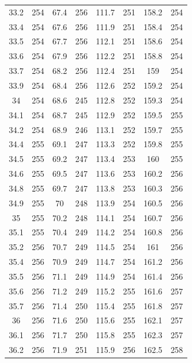 \documentclass[12pt]{ctexart}
\numberwithin{equation}{section}
\begin{document}
\begin{longtable}{cc|cc|cc|cc}
33.2  &  254  &  67.4  &  256  &  111.7  &  251  &  158.2  &  254  \\
33.4  &  254  &  67.6  &  256  &  111.9  &  251  &  158.4  &  254  \\
33.5  &  254  &  67.7  &  256  &  112.1  &  251  &  158.6  &  254  \\
33.6  &  254  &  67.9  &  256  &  112.2  &  251  &  158.8  &  254  \\
33.7  &  254  &  68.2  &  256  &  112.4  &  251  &  159  &  254  \\
33.9  &  254  &  68.4  &  256  &  112.6  &  252  &  159.2  &  254  \\
34  &  254  &  68.6  &  245  &  112.8  &  252  &  159.3  &  254  \\
34.1  &  254  &  68.7  &  245  &  112.9  &  252  &  159.5  &  255  \\
34.2  &  254  &  68.9  &  246  &  113.1  &  252  &  159.7  &  255  \\
34.4  &  255  &  69.1  &  247  &  113.3  &  252  &  159.8  &  255  \\
34.5  &  255  &  69.2  &  247  &  113.4  &  253  &  160  &  255  \\
34.6  &  255  &  69.5  &  247  &  113.6  &  253  &  160.2  &  256  \\
34.8  &  255  &  69.7  &  247  &  113.8  &  253  &  160.3  &  256  \\
34.9  &  255  &  70  &  248  &  113.9  &  254  &  160.5  &  256  \\
35  &  255  &  70.2  &  248  &  114.1  &  254  &  160.7  &  256  \\
35.1  &  255  &  70.4  &  249  &  114.2  &  254  &  160.8  &  256  \\
35.2  &  256  &  70.7  &  249  &  114.5  &  254  &  161  &  256  \\
35.4  &  256  &  70.9  &  249  &  114.7  &  254  &  161.2  &  256  \\
35.5  &  256  &  71.1  &  249  &  114.9  &  254  &  161.4  &  256  \\
35.6  &  256  &  71.2  &  249  &  115.2  &  255  &  161.6  &  257  \\
35.7  &  256  &  71.4  &  250  &  115.4  &  255  &  161.8  &  257  \\
36  &  256  &  71.6  &  250  &  115.6  &  255  &  162.1  &  257  \\
36.1  &  256  &  71.7  &  250  &  115.8  &  255  &  162.3  &  257  \\
36.2  &  256  &  71.9  &  251  &  115.9  &  256  &  162.5  &  258  \\

\end{longtable}
\end{document}

